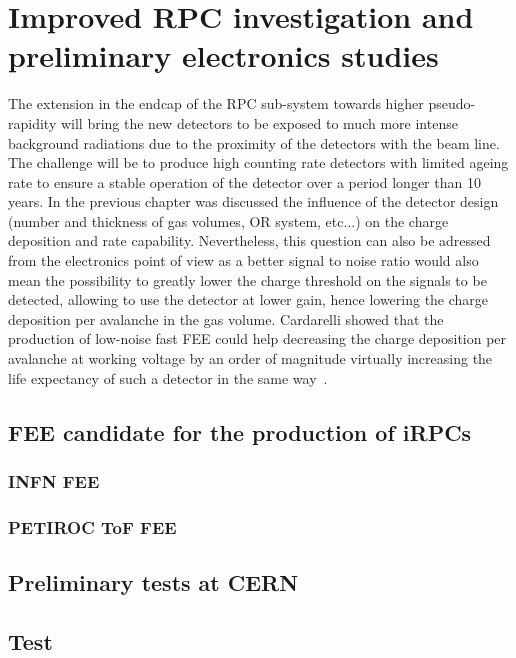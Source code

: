 \renewcommand\evenpagerightmark{{\scshape\small Chapter 6}}
\renewcommand\oddpageleftmark{{\scshape\small Improved RPC investigation and preliminary electronics studies}}

\renewcommand{\bibname}{References}

\hyphenation{}

\chapter[Improved RPC investigation and preliminary electronics studies]%
{Improved RPC investigation and preliminary electronics studies}
\label{chapt6}

The extension in the endcap of the RPC sub-system towards higher pseudo-rapidity will bring the new detectors to be exposed to much more intense background radiations due to the proximity of the detectors with the beam line. The challenge will be to produce high counting rate detectors with limited ageing rate to ensure a stable operation of the detector over a period longer than 10 years. In the previous chapter was discussed the influence of the detector design (number and thickness of gas volumes, OR system, etc...) on the charge deposition and rate capability. Nevertheless, this question can also be adressed from the electronics point of view as a better signal to noise ratio would also mean the possibility to greatly lower the charge threshold on the signals to be detected, allowing to use the detector at lower gain, hence lowering the charge deposition per avalanche in the gas volume. Cardarelli showed that the production of low-noise fast FEE could help decreasing the charge deposition per avalanche at working voltage by an order of magnitude virtually increasing the life expectancy of such a detector in the same way~\cite{CARDARELLI2012}.

\section{FEE candidate for the production of iRPCs}

	\subsection{INFN \acl{FEE}}
	
	\subsection{PETIROC \acl{ToF} \acl{FEE}}

\section{Preliminary tests at CERN}

\section{Test }

\clearpage{\pagestyle{empty}\cleardoublepage}